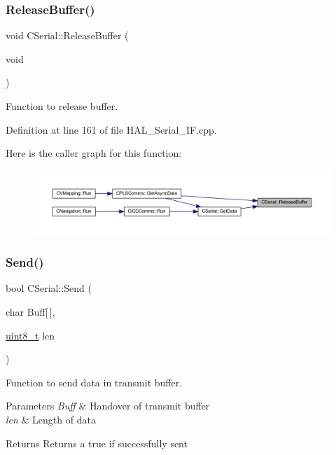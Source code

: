 \subsubsection{\texorpdfstring{ReleaseBuffer()}{ReleaseBuffer()}}
{\footnotesize\ttfamily void C\+Serial\+::\+Release\+Buffer (\begin{DoxyParamCaption}\item[{void}]{ }\end{DoxyParamCaption})}



Function to release buffer. 



Definition at line 161 of file H\+A\+L\+\_\+\+Serial\+\_\+\+I\+F.\+cpp.

Here is the caller graph for this function\+:
\nopagebreak
\begin{figure}[H]
\begin{center}
\leavevmode
\includegraphics[width=350pt]{class_c_serial_a941e5cae2ca04518925a3b32f51110a6_icgraph}
\end{center}
\end{figure}
\mbox{\label{class_c_serial_ae5bec6d6a1c75839ae02cf0069d1f08e}} 
\subsubsection{\texorpdfstring{Send()}{Send()}}
{\footnotesize\ttfamily bool C\+Serial\+::\+Send (\begin{DoxyParamCaption}\item[{char}]{Buff\mbox{[}$\,$\mbox{]},  }\item[{\mbox{\hyperlink{_a_d_a_s___types_8h_aba7bc1797add20fe3efdf37ced1182c5}{uint8\+\_\+t}}}]{len }\end{DoxyParamCaption})}



Function to send data in transmit buffer. 


\begin{DoxyParams}{Parameters}
{\em Buff} & Handover of transmit buffer \\
\hline
{\em len} & Length of data \\
\hline
\end{DoxyParams}
\begin{DoxyReturn}{Returns}
Returns a true if successfully sent 
\end{DoxyReturn}


